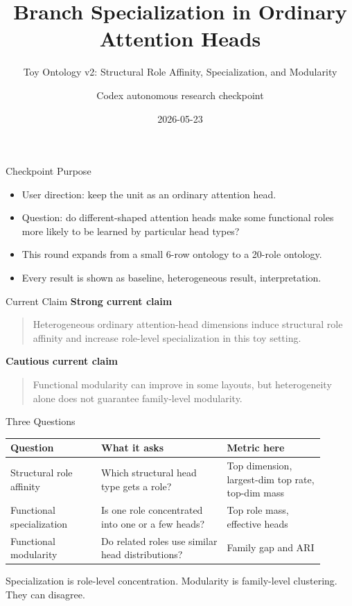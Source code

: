 \documentclass[aspectratio=169]{beamer}
\title[Toy Ontology v2]{Branch Specialization in Ordinary Attention Heads}
\subtitle{Toy Ontology v2: Structural Role Affinity, Specialization, and Modularity}
\author{Codex autonomous research checkpoint}
\date{2026-05-23}
\begin{document}
\begin{frame}
  \titlepage
\end{frame}

\begin{frame}{Checkpoint Purpose}
  \begin{itemize}
    \item User direction: keep the unit as an ordinary attention head.
    \item Question: do different-shaped attention heads make some functional roles more likely to be learned by particular head types?
    \item This round expands from a small 6-row ontology to a 20-role ontology.
    \item Every result is shown as baseline, heterogeneous result, interpretation.
  \end{itemize}
\end{frame}

\begin{frame}{Current Claim}
  \textbf{Strong current claim}
  \begin{quote}
    Heterogeneous ordinary attention-head dimensions induce structural role affinity and increase role-level specialization in this toy setting.
  \end{quote}

  \vspace{0.4cm}
  \textbf{Cautious current claim}
  \begin{quote}
    Functional modularity can improve in some layouts, but heterogeneity alone does not guarantee family-level modularity.
  \end{quote}
\end{frame}

\begin{frame}{Three Questions}
  \small
  \begin{tabular}{p{0.26\linewidth}p{0.36\linewidth}p{0.28\linewidth}}
    \toprule
    Question & What it asks & Metric here \\
    \midrule
    Structural role affinity & Which structural head type gets a role? & Top dimension, largest-dim top rate, top-dim mass \\
    Functional specialization & Is one role concentrated into one or a few heads? & Top role mass, effective heads \\
    Functional modularity & Do related roles use similar head distributions? & Family gap and ARI \\
    \bottomrule
  \end{tabular}

  \vspace{0.4cm}
  Specialization is role-level concentration. Modularity is family-level clustering. They can disagree.
\end{frame}
\end{document}

